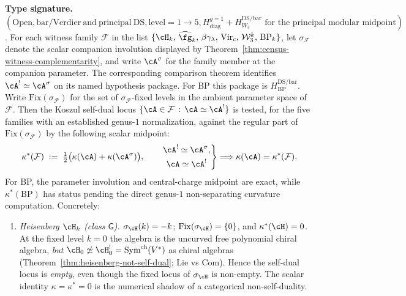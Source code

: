 \begin{theorem}
\label{thm:census-self-dual-locus}
\textbf{Type signature.}
$(\mathrm{Open},\mathrm{bar/Verdier\ and\ principal\ DS},
\mathrm{level}=1\to5,
H_{\mathrm{diag}}^{g=1}+H_{W_3}^{\mathrm{DS/bar}}
\text{ for the principal modular midpoint})$.
For each witness family $\mathcal{F}$ in the list
$\{\cH_k,\,\widehat{\fg}_k,\,\beta\gamma_\lambda,\,\mathrm{Vir}_c,\,
\mathcal{W}_3^k,\,\mathrm{BP}_k\}$, let $\sigma_\mathcal{F}$ denote
the scalar companion involution displayed by
Theorem~\ref{thm:census-witness-complementarity}, and write
$\cA^\sigma$ for the family member at the companion parameter.
The corresponding comparison theorem identifies
$\cA^!\simeq\cA^\sigma$ on its named hypothesis package.  For BP this
package is $H_{\mathrm{BP}}^{\mathrm{DS/bar}}$. Write
$\mathrm{Fix}(\sigma_\mathcal{F})$ for the set of $\sigma_\mathcal{F}$-fixed
levels in the ambient parameter space of $\mathcal{F}$. Then the
Koszul self-dual locus $\{\cA \in \mathcal{F}\,:\,\cA \simeq \cA^!\}$
is tested, for the five families with an established genus-$1$
normalization, against the regular part of
$\mathrm{Fix}(\sigma_\mathcal{F})$ by the following scalar midpoint:
\begin{equation}\label{eq:self-dual-kappa-star}
 \kappa^*(\mathcal{F}) \;:=\;
 \tfrac{1}{2}\bigl(\kappa(\cA) + \kappa(\cA^\sigma)\bigr),
 \qquad
 \left.
 \begin{gathered}
 \cA^!\simeq\cA^\sigma,\\
 \cA\simeq\cA^!
 \end{gathered}
 \right\}
 \Longrightarrow \kappa(\cA) = \kappa^*(\mathcal{F}).
\end{equation}
For BP, the parameter involution and central-charge midpoint are exact,
while $\kappa^*(\mathrm{BP})$ has status \ClaimStatusOpen pending the
direct genus-$1$ non-separating curvature computation.
Concretely:
\begin{enumerate}
\item \emph{Heisenberg $\cH_k$ (class $\mathsf{G}$).}
 $\sigma_\cH(k) = -k$; $\mathrm{Fix}(\sigma_\cH) = \{0\}$, and
 $\kappa^*(\cH) = 0$. At the fixed level $k = 0$ the algebra is the
 uncurved free polynomial chiral algebra, \emph{but}
 $\cH_0 \not\simeq \cH_0^! = \mathrm{Sym}^{\mathrm{ch}}(V^*)$ as
 chiral algebras \textup{(}Theorem~\ref{thm:heisenberg-not-self-dual};
 Lie vs Com\textup{)}. Hence the self-dual locus is \emph{empty}, even
 though the fixed locus of $\sigma_\cH$ is non-empty. The scalar
 identity $\kappa = \kappa^* = 0$ is the numerical shadow of a
 categorical non-self-duality.


\end{enumerate}
\end{theorem}
